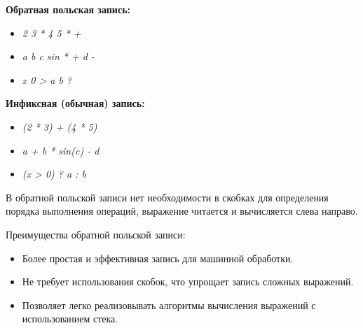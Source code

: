 \begin{minipage}[t]{0.45\textwidth}
	\centering \textbf{Обратная польская запись:}
	\begin{itemize}[label={}, font=\scriptsize, noitemsep, topsep=0pt, , partopsep=0pt]
	\item \centering \textit{\footnotesize 2 3 * 4 5 * +}
	\item \centering \textit{\footnotesize a b c sin * + d -}
	\item \centering \textit{\footnotesize x 0 > a b ?}
	\end{itemize}
\end{minipage}
\hspace{1cm}
\begin{minipage}[t]{0.45\textwidth}
	\centering \textbf{Инфиксная (обычная) запись:}
	\begin{itemize}[label={}, font=\scriptsize, noitemsep, topsep=0pt, , partopsep=0pt]
	\item \centering \textit{\footnotesize (2 * 3) + (4 * 5)}		
	\item \centering \textit{\footnotesize a + b * sin(c) - d}	
	\item \centering \textit{\footnotesize  (x > 0) ? a : b}
	\end{itemize}
\end{minipage}
\vspace{5pt}

В обратной польской записи нет необходимости в скобках для определения порядка выполнения операций, выражение читается и вычисляется слева направо.
\vspace{5pt}

Преимущества обратной польской записи:
\begin{itemize}[label=$\triangleright$, font=\footnotesize, noitemsep, topsep=0pt, , partopsep=0pt]
	\item {\footnotesize Более простая и эффективная запись для машинной обработки.}
	\item {\footnotesize Не требует использования скобок, что упрощает запись сложных выражений.}
	\item {\footnotesize Позволяет легко реализовывать алгоритмы вычисления выражений с использованием стека.}
\end{itemize}
\vspace{5pt}

